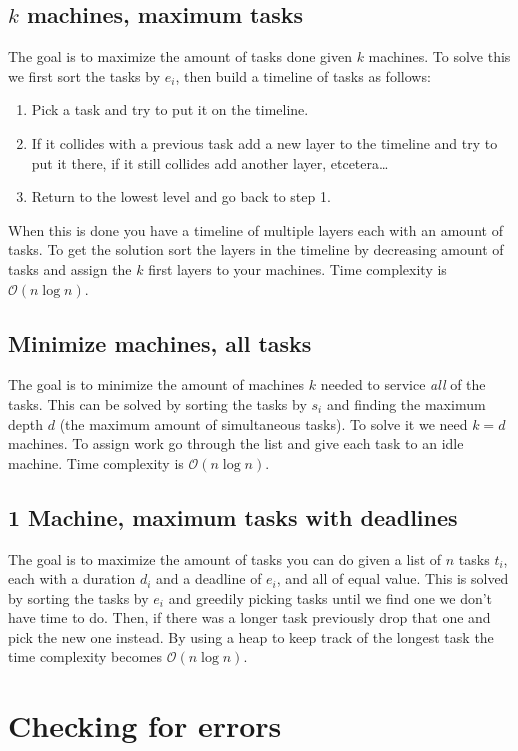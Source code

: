 \documentclass[8pt,a4paper,landscape,oneside]{amsart}
\newcommand{\bigO}{\mathcal{O}}
\begin{document}
\begin{multicols*}{3}
  \subsection{$k$ machines, maximum tasks}
  The goal is to maximize the amount of tasks done given $k$ machines. To solve this we first sort the tasks by $e_i$, then build a timeline of tasks as follows:
  \begin{enumerate}
    \item Pick a task and try to put it on the timeline.
    \item If it collides with a previous task add a new layer to the timeline and try to put it there, if it still collides add another layer, etcetera\ldots
    \item Return to the lowest level and go back to step 1.
  \end{enumerate}
  When this is done you have a timeline of multiple layers each with an amount of tasks. To get the solution sort the layers in the timeline by decreasing amount of tasks and assign the $k$ first layers to your machines. Time complexity is $\bigO(n\log n)$.
  
  \subsection{Minimize machines, all tasks}
  The goal is to minimize the amount of machines $k$ needed to service \emph{all} of the tasks. This can be solved by sorting the tasks by $s_i$ and finding the maximum depth $d$ (the maximum amount of simultaneous tasks). To solve it we need $k=d$ machines. To assign work go through the list and give each task to an idle machine. Time complexity is $\bigO(n\log n)$.
  
  \subsection{1 Machine, maximum tasks with deadlines}
  The goal is to maximize the amount of tasks you can do given a list of $n$ tasks $t_i$, each with a duration $d_i$ and a deadline of $e_i$, and all of equal value. This is solved by sorting the tasks by $e_i$ and greedily picking tasks until we find one we don't have time to do. Then, if there was a longer task previously drop that one and pick the new one instead. By using a heap to keep track of the longest task the time complexity becomes $\bigO(n\log n)$. 
        
        
\section{Checking for errors}

\end{multicols*}
\end{document}
